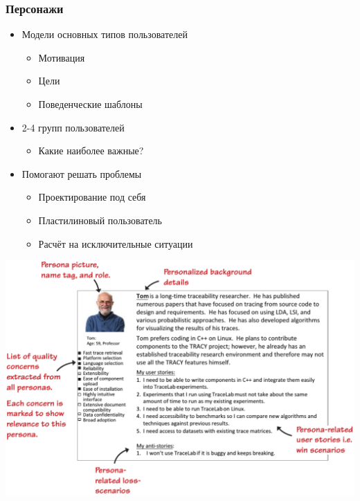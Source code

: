 \documentclass{../../slides-style}
\begin{document}
    \begin{frame}
        \frametitle{Персонажи}
        \begin{itemize}
            \item Модели основных типов пользователей
            \begin{itemize}
                \item Мотивация
                \item Цели
                \item Поведенческие шаблоны
            \end{itemize}
            \item 2-4 групп пользователей
            \begin{itemize}
                \item Какие наиболее важные?
            \end{itemize}
            \item Помогают решать проблемы
            \begin{itemize}
                \item Проектирование под себя
                \item Пластилиновый пользователь
                \item Расчёт на исключительные ситуации
            \end{itemize}
        \end{itemize}
    \end{frame}

    \begin{frame}
        \begin{center}
            \includegraphics[width=\textwidth]{tom.png}
        \end{center}
    \end{frame}
\end{document}

